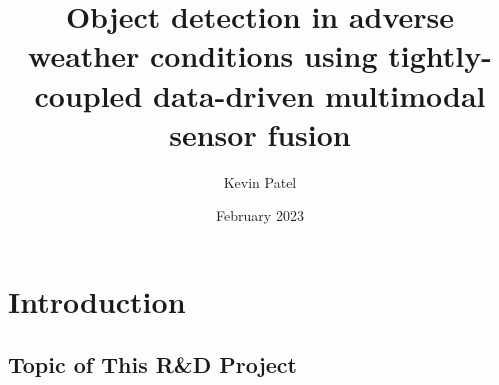 \documentclass[rnd]{mas_proposal}
\title{Object detection in adverse weather conditions using tightly-coupled data-driven multimodal sensor fusion}
\author{Kevin Patel}
\date{February 2023}
\begin{document}
\maketitle

\pagestyle{plain}

\section{Introduction}

\subsection{Topic of This R\&D Project}
\begin{itemize}
    





\end{itemize}
\end{document}
